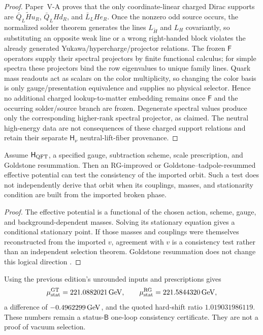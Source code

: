\documentclass[12pt,a4paper]{article}
\newcommand{\Hqft}{\mathsf{H}_{\rm QFT}}
\newcommand{\Hnu}{\mathsf{H}_{\nu}}
\begin{document}
\begin{proof}
Paper~V-A proves that the only coordinate-linear charged Dirac supports are
\(\bar Q_L\widetilde H u_R\), \(\bar Q_LHd_R\), and
\(\bar L_LHe_R\).  Once the nonzero odd source occurs, the normalized solder theorem generates the lines
\(L_{\widetilde H}\) and \(L_H\) covariantly, so substituting an
opposite weak line or a wrong right-handed block violates the already generated
Yukawa/hypercharge/projector relations.  The frozen \(\mathsf F\) operators
supply their spectral projectors by finite functional calculus; for simple
spectra these projectors bind the row eigenvalues to unique family lines.
Quark mass readouts act as scalars on the color multiplicity, so changing the
color basis is only gauge/presentation equivalence and supplies no physical
selector.  Hence no additional charged lookup-to-matter embedding remains once
\(\mathsf F\) and the occurring solder/source branch are frozen.  Degenerate spectral values
produce only the corresponding higher-rank spectral projector, as claimed.
The neutral high-energy data are not consequences of these charged support
relations and retain their separate \(\Hnu\) neutral-lift-fiber provenance.
\end{proof}

\begin{proposition}
\label{p7v2:prop:one-loop-ew-diagnostic}
Assume \(\Hqft\), a specified gauge, subtraction scheme, scale prescription,
and Goldstone resummation.  Then an RG-improved or
Goldstone--tadpole-resummed effective potential can test the consistency of the
imported orbit.  Such a test does not independently derive that orbit when its
couplings, masses, and stationarity condition are built from the imported
broken phase.
\end{proposition}

\begin{proof}
The effective potential is a functional of the chosen action, scheme, gauge,
and background-dependent masses.  Solving its stationary equation gives a
conditional stationary point.  If those masses and couplings were themselves
reconstructed from the imported \(v\), agreement with \(v\) is a consistency
test rather than an independent selection theorem.  Goldstone resummation does
not change this logical direction \cite{Martin2014Goldstone}.
\end{proof}

\begin{remark}
Using the previous edition's unrounded inputs and prescriptions gives
\[
 \mu_{\rm stat}^{\rm GT}=221.0882021\,{\rm GeV},
 \qquad
 \mu_{\rm stat}^{\rm RG}=221.5844320\,{\rm GeV},
\]
a difference of \(-0.4962299\,{\rm GeV}\), and the quoted hard-shift ratio
\(1.019031986119\).  These numbers remain a status-\(\mathsf B\)
one-loop consistency certificate.  They are not a proof of vacuum selection.
\end{remark}
\end{document}
